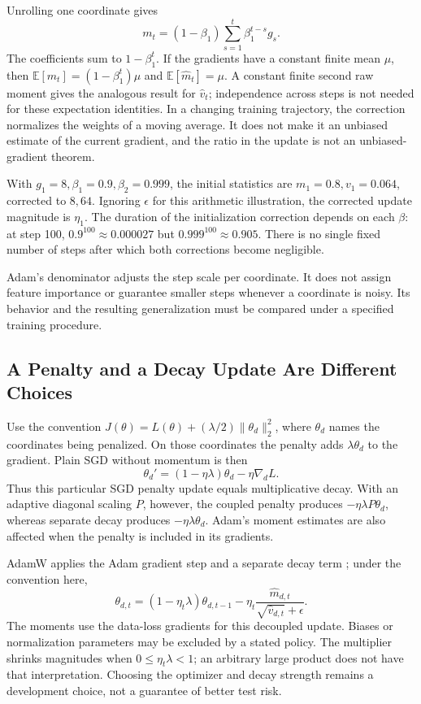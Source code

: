 Unrolling one coordinate gives
\[
m_t=(1-\beta_1)\sum_{s=1}^{t}\beta_1^{t-s}g_s.
\]
The coefficients sum to $1-\beta_1^t$. If the gradients have a constant finite mean $\mu$, then $\mathbb E[m_t]=(1-\beta_1^t)\mu$ and $\mathbb E[\hat m_t]=\mu$. A constant finite second raw moment gives the analogous result for $\hat v_t$; independence across steps is not needed for these expectation identities. In a changing training trajectory, the correction normalizes the weights of a moving average. It does not make it an unbiased estimate of the current gradient, and the ratio in the update is not an unbiased-gradient theorem.

With $g_1=8,\beta_1=0.9,\beta_2=0.999$, the initial statistics are $m_1=0.8,v_1=0.064$, corrected to $8,64$. Ignoring $\epsilon$ for this arithmetic illustration, the corrected update magnitude is $\eta_1$. The duration of the initialization correction depends on each $\beta$: at step 100, $0.9^{100}\approx0.000027$ but $0.999^{100}\approx0.905$. There is no single fixed number of steps after which both corrections become negligible.

Adam's denominator adjusts the step scale per coordinate. It does not assign feature importance or guarantee smaller steps whenever a coordinate is noisy. Its behavior and the resulting generalization must be compared under a specified training procedure.

\subsection{A Penalty and a Decay Update Are Different Choices}

Use the convention $J(\theta)=L(\theta)+(\lambda/2)\|\theta_d\|_2^2$, where $\theta_d$ names the coordinates being penalized. On those coordinates the penalty adds $\lambda\theta_d$ to the gradient. Plain SGD without momentum is then
\[
\theta_d'=(1-\eta\lambda)\theta_d-\eta\nabla_d L.
\]
Thus this particular SGD penalty update equals multiplicative decay. With an adaptive diagonal scaling $P$, however, the coupled penalty produces $-\eta\lambda P\theta_d$, whereas separate decay produces $-\eta\lambda\theta_d$. Adam's moment estimates are also affected when the penalty is included in its gradients.

AdamW applies the Adam gradient step and a separate decay term \citep{loshchilov2019adamw}; under the convention here,
\[
\theta_{d,t}=(1-\eta_t\lambda)\theta_{d,t-1}
-\eta_t\frac{\hat m_{d,t}}{\sqrt{\hat v_{d,t}}+\epsilon}.
\]
The moments use the data-loss gradients for this decoupled update. Biases or normalization parameters may be excluded by a stated policy. The multiplier shrinks magnitudes when $0\leq\eta_t\lambda<1$; an arbitrary large product does not have that interpretation. Choosing the optimizer and decay strength remains a development choice, not a guarantee of better test risk.

